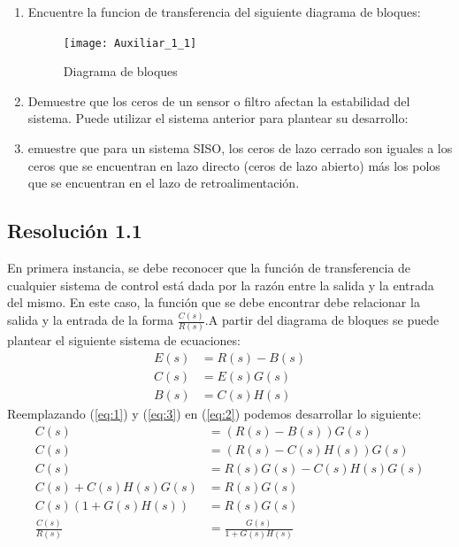 \documentclass[
  11pt,
  letterpaper,
   addpoints,
   answers
  ]{exam}
\begin{document}
\begin{questions}
    \question 
    \begin{enumerate}
        \item Encuentre la funcion de transferencia del siguiente diagrama de bloques:
        \begin{figure}[h!]
            \centering
            \texttt{[image: Auxiliar\_1\_1]}
            \caption{Diagrama de bloques}    
        \end{figure}
        \item Demuestre que los ceros de un sensor o filtro afectan la estabilidad del sistema. Puede utilizar el sistema anterior para plantear su desarrollo:
        \item emuestre que para un sistema SISO, los ceros de lazo cerrado son iguales a los ceros que se encuentran en lazo directo (ceros de lazo abierto) más los polos que se encuentran
        en el lazo de retroalimentación.
    \end{enumerate}
    \begin{solution}
        \subsection*{Resolución 1.1}
        En primera instancia, se debe reconocer que la función de transferencia de cualquier sistema de control está dada por la razón entre la salida y la entrada del mismo. En este caso, la función que se debe encontrar debe relacionar la salida y la entrada de la forma $\frac{C(s)}{R(s)}$.A partir del diagrama de bloques se puede plantear el siguiente sistema de ecuaciones:
        \begin{align}
            E(s)&=R(s)-B(s) \label{eq:1} \\ 
            C(s)&=E(s)G(s) \label{eq:2} \\
            B(s)&=C(s)H(s) \label{eq:3}
        \end{align}
        Reemplazando (\ref{eq:1}) y (\ref{eq:3}) en (\ref{eq:2}) podemos desarrollar lo siguiente:
        \begin{align}
            C(s)&=(R(s)-B(s))G(s) \nonumber \\
            C(s)&=(R(s)-C(s)H(s))G(s) \nonumber \\
            C(s)&=R(s)G(s)-C(s)H(s)G(s) \nonumber \\
            C(s)+C(s)H(s)G(s)&=R(s)G(s) \nonumber \\
            C(s)(1+G(s)H(s))&=R(s)G(s) \nonumber \\
            \frac{C(s)}{R(s)}&=\frac{G(s)}{1+G(s)H(s)} \label{eq:final} 
        \end{align}
        

\end{solution}
\end{questions}
\end{document}
